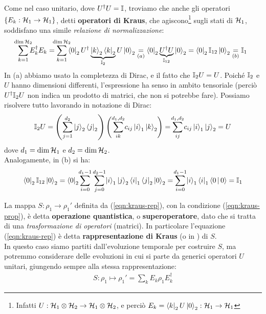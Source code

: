 \documentclass[../../InformazioneQuantistica.tex]{subfiles}
\begin{document}
Come nel caso unitario, dove $U^\dag U = \mathbb{I}$, troviamo che anche gli operatori $\{E_k: \mathcal{H}_1 \to \mathcal{H}_1\}$, detti \textbf{operatori di Kraus}, che agiscono\footnote{Infatti $U:\mathcal{H}_1 \otimes \mathcal{H}_2 \to \mathcal{H}_1 \otimes \mathcal{H}_2$, e perciò $E_k = \Bra{k}_2 U \Ket{0}_2:\mathcal{H}_1 \to \mathcal{H}_1$} sugli stati di $\mathcal{H}_1$, soddisfano una simile \textit{relazione di normalizzazione}:
\begin{align}
\smashoperator{\sum_{k=1}^{\op{dim}\hs_2}} E_k^\dag E_k = \smashoperator{\sum_{k=1}^{\op{dim}\hs_2}} \bra{0}_2 U^\dag \underbrace{\ket{k}_2\bra{k}_2}_{\bb{I}_2}U\ket{0}_2 \underset{(a)}{=} \bra{0}_2 \underbrace{U^\dag U}_{\bb{I}_{12}} \ket{0}_2 = \bra{0}_2\bb{I}_{12}\ket{0}_2 \underset{(b)}{=} \bb{I}_1
\label{eqn:kraus-prop}
\end{align}
In (a) abbiamo usato la completezza di Dirac, e il fatto che $\mathbb{I}_2 U = U$. Poiché $\mathbb{I}_2$ e $U$ hanno dimensioni differenti, l'espressione ha senso in ambito tensoriale (perciò $U^\dag \mathbb{I}_2 U$ non indica un prodotto di matrici, che non si potrebbe fare). Possiamo risolvere tutto lavorando in notazione di Dirac:
\begin{align*}
    \bb{I}_2 U = \left( \smashoperator[r]{\sum_{j=1}^{d_2}} \ket{j}_2 \bra{j}_2 \right) \left( \smashoperator[r]{\sum_{ik}^{d_1,d_2}} c_{ij}\ket{i}_1 \ket{k}_2 \right) = \smashoperator{\sum_{ij}^{d_{1},d_2}} c_{ij} \ket{i}_1 \ket{j}_2 = U
\end{align*}
dove $d_1 = \operatorname{dim}\mathcal{H}_1$ e $d_2 = \operatorname{dim}\mathcal{H}_2$.\\
Analogamente, in (b) si ha:
\begin{align*}
    \bra{0}_2 \bb{I}_{12} \ket{0}_2 = \bra{0}_2 \smashoperator[l]{\sum_{i=0}^{d_1-1}} 
    \smashoperator[r]{\sum_{j=0}^{d_2-1}}
    \ket{i}_1 \ket{j}_2 \bra{i}_1 \bra{j}_2 \ket{0}_2 = \smashoperator{\sum_{i=0}^{d_1-1}} \ket{i}_1 \bra{i}_1 \braket{0|0} = \bb{I}_1
\end{align*}


La mappa $S:\rho_1 \to \rho_1'$ definita da (\ref{eqn:kraus-rep}), con la condizione (\ref{eqn:kraus-prop}), è detta \textbf{operazione quantistica}, o \textbf{superoperatore}, dato che si tratta di una \textit{trasformazione di operatori} (matrici). In particolare l'equazione (\ref{eqn:kraus-rep}) è detta \textbf{rappresentazione di Kraus} (o in ) di $S$.\\
In questo caso siamo partiti dall'evoluzione temporale per costruire $S$, ma potremmo considerare delle evoluzioni  in cui si parte da generici operatori $U$ unitari, giungendo sempre alla stessa rappresentazione:
\begin{align*}
S: \rho_1 \mapsto \rho_1' = \sum_{k} E_k \rho_1 E_k^\dag
\end{align*}
\end{document}
